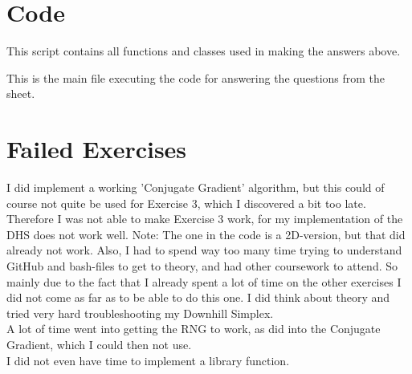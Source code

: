 \documentclass[10pt]{article}
\begin{document}
\section{Code}
This script contains all functions and classes used in making the answers above.

This is the main file executing the code for answering the questions from the sheet.


\section{Failed Exercises}
I did implement a working 'Conjugate Gradient' algorithm, but this could of course not quite be used for Exercise 3, which I discovered a bit too late. Therefore I was not able to make Exercise 3 work, for my implementation of the DHS does not work well. Note: The one in the code is a 2D-version, but that did already not work. Also, I had to spend way too many time trying to understand GitHub and bash-files to get to theory, and had other coursework to attend. So mainly due to the fact that I already spent a lot of time on the other exercises I did not come as far as to be able to do this one. I did think about theory and tried very hard troubleshooting my Downhill Simplex.\\
A lot of time went into getting the RNG to work, as did into the Conjugate Gradient, which I could then not use.\\
I did not even have time to implement a library function.
\end{document}
